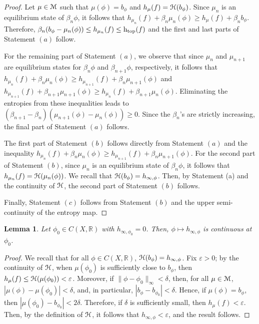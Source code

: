 \documentclass[11pt, reqno]{amsart}
\newtheorem{lemma}[theorem]{Lemma}
\renewcommand{\epsilon}{\varepsilon}
\newcommand{\cM}{\EuScript{M}}
\newcommand{\cH}{\EuScript{H}}
\newcommand{\bR}{{\mathbb R}}
\begin{document}
\begin{proof}
Let $\mu\in\cM$ such that $\mu(\phi)=b_\phi$ and $h_{\mu}(f)=\cH(b_\phi)$.  Since $\mu_n$ is an equilibrium state of $\beta_n\phi$, it follows that $h_{\mu_n}(f)+\beta_n\mu_n(\phi)\geq h_{\mu}(f)+\beta_n b_\phi$.  Therefore, $\beta_n(b_\phi-\mu_n(\phi))\leq h_{\mu_n}(f)\leq{\text h_{{\rm top}}}(f)$ and the first and last parts of Statement $(a)$ follow.

For the remaining part of Statement $(a)$, we observe that since $\mu_n$ and $\mu_{n+1}$ are equilibrium states for $\beta_n\phi$ and $\beta_{n+1}\phi$, respectively, it follows that $h_{\mu_n}(f)+\beta_n\mu_n(\phi)\geq h_{\mu_{n+1}}(f)+\beta_n\mu_{n+1}(\phi)$ and $h_{\mu_{n+1}}(f)+\beta_{n+1}\mu_{n+1}(\phi)\geq h_{\mu_{n}}(f)+\beta_{n+1}\mu_{n}(\phi)$.  Eliminating the entropies from these inequalities leads to $(\beta_{n+1}-\beta_n)(\mu_{n+1}(\phi)-\mu_n(\phi))\geq0$.  Since the $\beta_n$'s are strictly increasing, the final part of Statement $(a)$ follows.

The first part of Statement $(b)$ follows directly from Statement $(a)$ and the inequality $h_{\mu_n}(f)+\beta_n\mu_n(\phi)\geq h_{\mu_{n+1}}(f)+\beta_n\mu_{n+1}(\phi)$.  For the second part of Statement $(b)$, since $\mu_n$ is an equilibrium state of $\beta_n\phi$, it follows that $h_{\mu_n}(f)=\cH(\mu_n(\phi))$.  We recall that $\cH(b_\phi)=h_{\infty,\phi}$.  Then, by Statement (a) and the continuity of $\cH$, the second part of Statement $(b)$ follows.  

Finally, Statement $(c)$ follows from Statement $(b)$ and the upper semi-continuity of the entropy map.
\end{proof}


\begin{lemma}\label{lem2a}Let $\phi_0\in C(X,\bR)$ with $h_{\infty,\phi_0}=0$. Then, $\phi\mapsto h_{\infty,\phi}$ is continuous at $\phi_0$.
\end{lemma}
\begin{proof}
We recall that for all $\phi\in C(X,\bR)$, $\cH(b_\phi)=h_{\infty,\phi}$.  Fix $\epsilon>0$; by the continuity of $\cH$, when $\mu(\phi_0)$ is sufficiently close to $b_\phi$, then $h_{\mu}(f)\leq\cH(\mu(\phi_0))<\epsilon$.  Moreover, if $\|\phi-\phi_0\|_\infty<\delta$, then, for all $\mu\in\cM$, $|\mu(\phi)-\mu(\phi_0)|<\delta$, and, in particular, $|b_\phi-b_{\phi_0}|<\delta$.  Hence, if $\mu(\phi)=b_\phi$, then $|\mu(\phi_0)-b_{\phi_0}|<2\delta$.  Therefore, if $\delta$ is sufficiently small, then $h_{\mu}(f)<\epsilon$.  Then, by the definition of $\cH$, it follows that $h_{\infty,\phi}<\epsilon$, and the result follows.
\end{proof}
\end{document}
